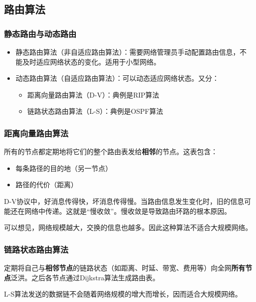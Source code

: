 \documentclass[12pt, a4paper, oneside]{ctexart}
\begin{document}
\subsection{路由算法}

\subsubsection{静态路由与动态路由}

\begin{itemize}
    \item 静态路由算法（非自适应路由算法）：需要网络管理员手动配置路由信息，不能及时适应网络状态的变化。适用于小型网络。
    \item 动态路由算法（自适应路由算法）：可以动态适应网络状态。又分：
    \begin{itemize}
        \item 距离向量路由算法（D-V）：典例是RIP算法
        \item 链路状态路由算法（L-S）：典例是OSPF算法
    \end{itemize}
\end{itemize}

\subsubsection{距离向量路由算法}

所有的节点都定期地将它们的整个路由表发给\textbf{相邻}的节点。这表包含：
\begin{itemize}
    \item 每条路径的目的地（另一节点）
    \item 路径的代价（距离）
\end{itemize}

D-V协议中，好消息传得快，坏消息传得慢。当路由信息发生变化时，旧的信息可能还在网络中传递。这就是“慢收敛”。慢收敛是导致路由环路的根本原因。

可以想见，网络规模越大，交换的信息也越多。因此这种算法不适合大规模网络。

\subsubsection{链路状态路由算法}

定期将自己与\textbf{相邻节点}的链路状态（如距离、时延、带宽、费用等）向全网\textbf{所有节点}泛洪。之后各节点通过Dijkstra算法生成路由表。

L-S算法发送的数据链不会随着网络规模的增大而增长，因而适合大规模网络。
\end{document}
